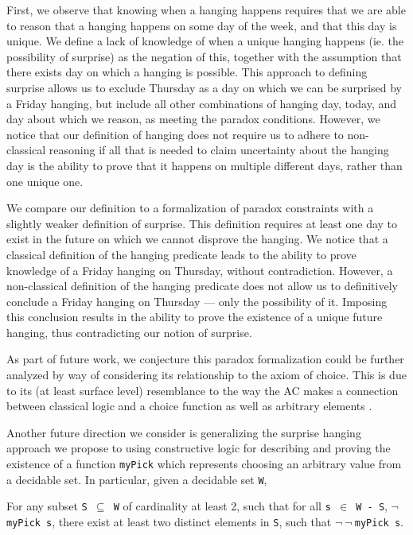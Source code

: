 \documentclass[runningheads]{llncs}
\newenvironment{myindent}{\begin{adjustwidth}{1cm}{}}{\end{adjustwidth}}
\begin{document}
First, we observe that knowing when a hanging happens requires that we are able to
reason that a hanging happens on some day of the week, and that this day is unique.
We define a lack of knowledge of when a unique hanging happens (ie. the possibility of surprise)
as the negation of this,
together with the assumption that there exists day on which a hanging is possible.
This approach to defining surprise allows us to exclude Thursday
as a day on which we can be surprised by a Friday hanging, but include all other
combinations of hanging day, today, and day about which we reason, as meeting
the paradox conditions. However, we notice that
our definition of hanging does not require us to adhere to non-classical
reasoning if all that is needed to claim uncertainty about the hanging day
is the ability to prove that it happens on multiple different days, rather than one unique one.

We compare our definition to a formalization of paradox constraints with a slightly
weaker definition of surprise. This definition requires at least one day to
exist in the future on which we cannot disprove the hanging. We notice that a classical
definition of the hanging predicate leads to the ability to prove knowledge of a
Friday hanging on Thursday, without contradiction. However, a non-classical
definition of the hanging predicate does not allow us to definitively conclude a Friday hanging
on Thursday --- only the possibility of it. Imposing this conclusion results in
the ability to prove the existence of a unique future hanging, thus contradicting
our notion of surprise.

As part of future work, we conjecture this paradox formalization could be further analyzed by way of considering its
relationship to the axiom of choice. This is due to its (at least surface level)
resemblance to the way the AC makes a connection between classical logic
and a choice function \cite{accomp} as well as arbitrary elements \cite{randomness}.

Another future direction we consider is generalizing the surprise hanging
approach we propose to using constructive logic for describing and proving
the existence of a function {\tt myPick}
which represents choosing an arbitrary value from a decidable set. In particular,
given a decidable set {\tt W}, \newline

\begin{myindent}
For any subset {\tt S $\subseteq$ W} of cardinality at least 2, such that for all
{\tt s $\in$ W - S}, $\neg ${\tt myPick s}, there exist at least two distinct
elements in {\tt S}, such that $\neg~\neg~${\tt myPick s}.
\end{myindent}
\end{document}
